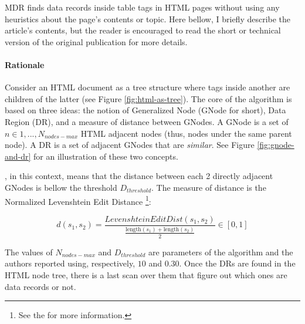 \documentclass[10pt]{article}
\newcommand{\maxnodes}{N_{nodes-max}}
\newcommand{\dth}{D_{threshold}}
\begin{document}
MDR finds data records inside table tags in HTML pages without using any heuristics about the page's contents or topic. Here bellow, I briefly describe the article's contents, but the reader is encouraged to read the short \citep{mdr} or technical \citep{mdr-technical} version of the original publication for more details.


\paragraph{Rationale}

Consider an HTML document as a tree structure where tags inside another are children of the latter (see Figure \ref{fig:html-as-tree}). The core of the algorithm is based on three ideas: the notion of Generalized Node (GNode for short), Data Region (DR), and a measure of distance between GNodes. A GNode is a set of $n \in {1, ..., \maxnodes}$ HTML adjacent nodes (thus, nodes under the same parent node). A DR is a set of adjacent GNodes that are \emph{similar}. See Figure \ref{fig:gnode-and-dr} for an illustration of these two concepts.

, in this context, means that the distance between each 2 directly adjacent GNodes is bellow the threshold $\dth$. The measure of distance is the Normalized Levenshtein Edit Distance \footnote{See the \cite{lev-dist-wiki} for more information.}:

\begin{equation}\label{eq:dist}
    d\left(s_{1}, s_{2}\right)=\frac{LevenshteinEditDist\left(s_{1}, s_{2}\right)}{\frac{\text {length}\left(s_{1}\right)+\text {length}\left(s_{2}\right)}{2}} \in [0, 1]
\end{equation}

The values of $\maxnodes$ and $\dth$ are parameters of the algorithm and the authors reported using, respectively, $10$ and $0.30$. Once the DRs are found in the HTML node tree, there is a last scan over them that figure out which ones are data records or not.
\end{document}
